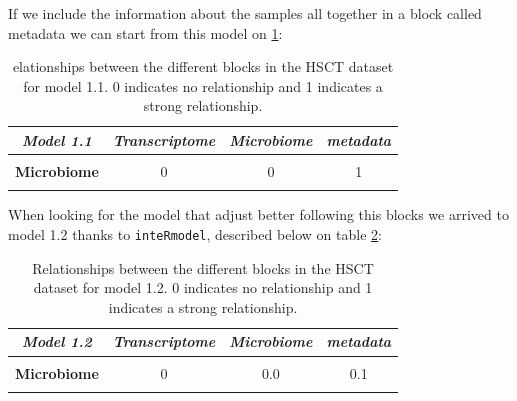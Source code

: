 \documentclass[
  12pt,
  a4paper,
  twoside,
  openright]{book}
\begin{document}
If we include the information about the samples all together in a block called metadata we can start from this model on \ref{tab:hsct-model1-1}:

\begin{table}[H]

\caption[Model 1.1 the of HSCT dataset.]{\label{tab:hsct-model1-1}elationships between the different blocks in the HSCT dataset for model 1.1. 0 indicates no relationship and 1 indicates a strong relationship.}
\centering
\begin{tabular}[t]{|>{}c|c|c|>{}c|}
\hline
\em{\textbf{Model 1.1}} & \em{\textbf{Transcriptome}} & \em{\textbf{Microbiome}} & \em{\textbf{metadata}}\\
\hline
\textbf{\cellcolor{gray!6}{Transcriptome}} & \cellcolor{gray!6}{0} & \cellcolor{gray!6}{0} & \cellcolor{gray!6}{1}\\
\hline
\textbf{Microbiome} & 0 & 0 & 1\\
\hline
\textbf{\cellcolor{gray!6}{metadata}} & \cellcolor{gray!6}{1} & \cellcolor{gray!6}{1} & \cellcolor{gray!6}{0}\\
\hline
\end{tabular}
\end{table}

When looking for the model that adjust better following this blocks we arrived to model 1.2 thanks to \texttt{inteRmodel}, described below on table \ref{tab:hsct-model1-2}:

\begin{table}[H]

\caption[Model 1.2 of the HSCT dataset.]{\label{tab:hsct-model1-2}Relationships between the different blocks in the HSCT dataset for model 1.2. 0 indicates no relationship and 1 indicates a strong relationship.}
\centering
\begin{tabular}[t]{|>{}c|c|c|>{}c|}
\hline
\em{\textbf{Model 1.2}} & \em{\textbf{Transcriptome}} & \em{\textbf{Microbiome}} & \em{\textbf{metadata}}\\
\hline
\textbf{\cellcolor{gray!6}{Transcriptome}} & \cellcolor{gray!6}{0} & \cellcolor{gray!6}{0.0} & \cellcolor{gray!6}{1.0}\\
\hline
\textbf{Microbiome} & 0 & 0.0 & 0.1\\
\hline
\textbf{\cellcolor{gray!6}{metadata}} & \cellcolor{gray!6}{1} & \cellcolor{gray!6}{0.1} & \cellcolor{gray!6}{0.0}\\
\hline
\end{tabular}
\end{table}
\end{document}
